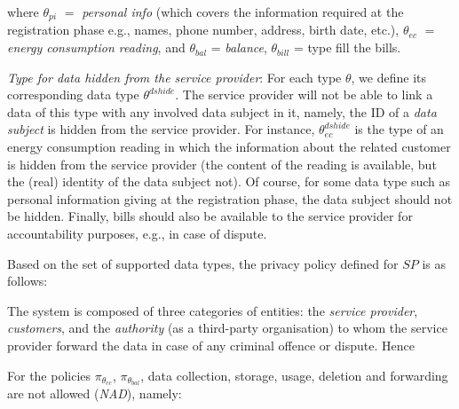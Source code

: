 \documentclass[a4paper]{article}
\begin{document}
where $\theta_{pi}$ $=$ \textit{personal info} (which covers  the information required at the registration phase e.g., names, phone number, address, birth date, etc.), $\theta_{ec}$ $=$ \textit{energy consumption reading}, and $\theta_{bal}$ = \textit{balance}, $\theta_{bill}$ = type fill the bills. 

\textit{Type for data hidden from the service provider}: For each type $\theta$, we define its corresponding data type $\theta^{dshide}$. The service provider will not be able to link a data of this type with any involved data subject in it, namely,  the ID of a \textit{data subject} is hidden from the service provider.  For instance, $\theta^{dshide}_{ec}$ is the type of an energy consumption reading in which the information about the related customer is hidden from the service provider (the content of the reading is available, but the (real) identity of the data subject  not). Of course, for some data type such as personal information giving at the registration phase, the data subject should not be hidden. Finally, bills should also be available to the service provider for accountability purposes, e.g., in case of dispute.   

Based on the set of supported data types, the privacy policy defined for $SP$ 
is as follows: 

\begin{center}
\noindent{}
\end{center} 

The system is composed of three categories of entities: the \textit{service provider}, \textit{customers}, and the\textit{ authority} (as a third-party organisation) to whom the service provider forward the data in case of any criminal offence or dispute. Hence   

\begin{center}
\noindent{}
\end{center}  

For the policies  $\pi_{\theta_{ec}}$, $\pi_{\theta_{bal}}$, data collection, storage, usage, deletion and forwarding are not allowed (\textit{NAD}), namely:
\end{document}
